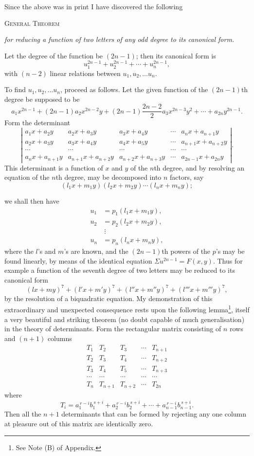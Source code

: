 \documentclass[11pt]{article}
\newcommand{\sourcepage}[1]{\marginpar{\scriptsize p.~#1}}
\begin{document}
{{Since the above was in print I have discovered the following

\begin{center}
{\scshape General Theorem}

\emph{for reducing a function of two letters of any odd degree to its canonical form.}
\end{center}

Let the degree of the function be $(2n-1)$; then its canonical form is
\[
 u_1^{2n-1}+u_2^{2n-1}+\cdots+u_n^{2n-1},
\]
with $(n-2)$ linear relations between $u_1,u_2,\ldots u_n$.

To find $u_1,u_2,\ldots u_n$, proceed as follows. Let the given function of the $(2n-1)$th degree be supposed to be
\[
 a_1x^{2n-1}+(2n-1)a_2x^{2n-2}y+(2n-1)\frac{2n-2}{2}a_3x^{2n-3}y^2+\cdots+a_{2n}y^{2n-1}.
\]
Form the determinant
\[
\left|
\begin{array}{ccccc}
a_1x+a_2y&a_2x+a_3y&a_3x+a_4y&\cdots&a_nx+a_{n+1}y\\
a_2x+a_3y&a_3x+a_4y&a_4x+a_5y&\cdots&a_{n+1}x+a_{n+2}y\\
\cdots&\cdots&\cdots&\cdots&\cdots\\
a_nx+a_{n+1}y&a_{n+1}x+a_{n+2}y&a_{n+2}x+a_{n+3}y&\cdots&a_{2n-1}x+a_{2n}y
\end{array}
\right|.
\]
This determinant is a function of $x$ and $y$ of the $n$th degree, and by resolving an equation of the $n$th degree, may be decomposed into $n$ factors, say
\[
 (l_1x+m_1y)(l_2x+m_2y)\cdots(l_nx+m_ny);
\]

\sourcepage{209}
we shall then have
\[
\begin{aligned}
u_1&=p_1(l_1x+m_1y),\\
u_2&=p_2(l_2x+m_2y),\\
&\ \vdots\\
u_n&=p_n(l_nx+m_ny),
\end{aligned}
\]
where the $l$'s and $m$'s are known, and the $(2n-1)$th powers of the $p$'s may be found linearly, by means of the identical equation $\Sigma u^{2n-1}=F(x,y)$. Thus for example a function of the seventh degree of two letters may be reduced to its canonical form
\[
 (lx+my)^7+(l'x+m'y)^7+(l''x+m''y)^7+(l'''x+m'''y)^7,
\]
by the resolution of a biquadratic equation. My demonstration of this extraordinary and unexpected consequence rests upon the following lemma\footnote{See Note (B) of Appendix.}, itself a very beautiful and striking theorem (no doubt capable of much generalisation) in the theory of determinants. Form the rectangular matrix consisting of $n$ rows and $(n+1)$ columns
\[
\begin{array}{ccccc}
T_1&T_2&T_3&\cdots&T_{n+1}\\
T_2&T_3&T_4&\cdots&T_{n+2}\\
T_3&T_4&T_5&\cdots&T_{n+3}\\
\cdots&\cdots&\cdots&\cdots&\cdots\\
T_n&T_{n+1}&T_{n+2}&\cdots&T_{2n}
\end{array}
\]
where
\[
 T_i=a_1^{\,r-i}b_1^{\,s+i}+a_2^{\,r-i}b_2^{\,s+i}+\cdots+a_{n-1}^{\,r-i}b_{n-1}^{\,s+i}.
\]
Then all the $n+1$ determinants that can be formed by rejecting any one column at pleasure out of this matrix are identically zero.

}}
\end{document}
